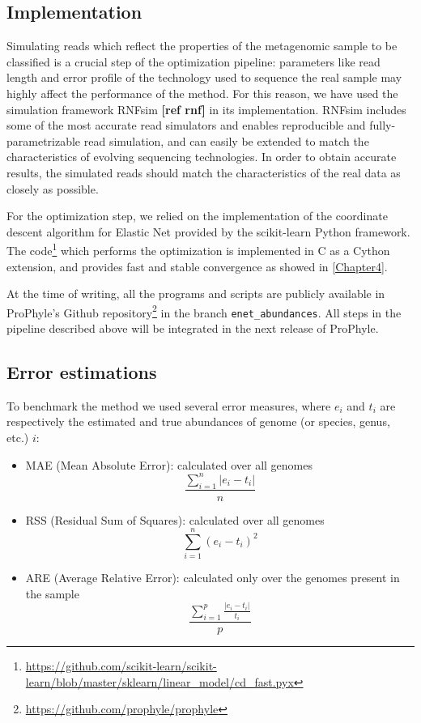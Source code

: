 \subsection{Implementation}

Simulating reads which reflect the properties of the metagenomic sample to be classified is a crucial step of the optimization pipeline: parameters like read length and error profile of the technology used to sequence the real sample may highly affect the performance of the method. For this reason, we have used the simulation framework RNFsim \textbf{[ref rnf]} in its implementation. RNFsim includes some of the most accurate read simulators and enables reproducible and fully-parametrizable read simulation, and can easily be extended to match the characteristics of evolving sequencing technologies. In order to obtain accurate results, the simulated reads should match the characteristics of the real data as closely as possible.

For the optimization step, we relied on the implementation of the coordinate descent algorithm for Elastic Net provided by the scikit-learn Python framework. The code\footnote{\url{https://github.com/scikit-learn/scikit-learn/blob/master/sklearn/linear_model/cd_fast.pyx}} which performs the optimization is implemented in C as a Cython extension, and provides fast and stable convergence as showed in \ref{Chapter4}.

At the time of writing, all the programs and scripts are publicly available in ProPhyle's Github repository\footnote{\url{https://github.com/prophyle/prophyle}} in the branch \texttt{enet\_abundances}. All steps in the pipeline described above will be integrated in the next release of ProPhyle.

\subsection{Error estimations}

To benchmark the method we used several error measures, where $e_i$ and $t_i$ are respectively the estimated and true abundances of genome (or species, genus, etc.) $i$:
\begin{itemize}
  \item MAE (Mean Absolute Error): calculated over all genomes
  \begin{equation*}
    \frac{\sum_{i=1}^n |e_i - t_i|}{n}
  \end{equation*}
  \item RSS (Residual Sum of Squares): calculated over all genomes
  \begin{equation*}
    \sum_{i=1}^n (e_i - t_i)^2
  \end{equation*}
  \item ARE (Average Relative Error): calculated only over the genomes present in the sample
  \begin{equation*}
    \frac{\sum_{i=1}^p \frac{|e_i - t_i|}{t_i}}{p}
  \end{equation*}
\end{itemize}
